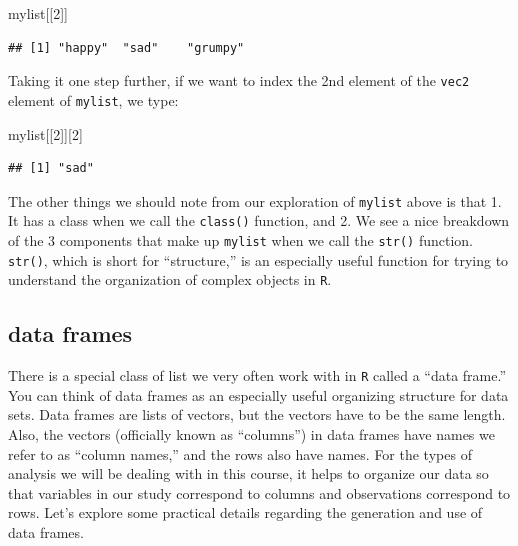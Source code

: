 \documentclass[]{book}
\newenvironment{Shaded}{\begin{snugshade}}{\end{snugshade}}
\newcommand{\DecValTok}[1]{\textcolor[rgb]{0.00,0.00,0.81}{#1}}
\newcommand{\NormalTok}[1]{#1}
\begin{document}
\begin{Shaded}
\begin{Highlighting}[]
\NormalTok{mylist[[}\DecValTok{2}\NormalTok{]]}
\end{Highlighting}
\end{Shaded}

\begin{verbatim}
## [1] "happy"  "sad"    "grumpy"
\end{verbatim}

Taking it one step further, if we want to index the 2nd element of the \texttt{vec2} element of \texttt{mylist}, we type:

\begin{Shaded}
\begin{Highlighting}[]
\NormalTok{mylist[[}\DecValTok{2}\NormalTok{]][}\DecValTok{2}\NormalTok{]}
\end{Highlighting}
\end{Shaded}

\begin{verbatim}
## [1] "sad"
\end{verbatim}

The other things we should note from our exploration of \texttt{mylist} above is that 1. It has a class when we call the \texttt{class()} function, and 2. We see a nice breakdown of the 3 components that make up \texttt{mylist} when we call the \texttt{str()} function. \texttt{str()}, which is short for ``structure,'' is an especially useful function for trying to understand the organization of complex objects in \texttt{R}.

\hypertarget{data-frames}{%
\subsection{data frames}\label{data-frames}}

There is a special class of list we very often work with in \texttt{R} called a ``data frame.'' You can think of data frames as an especially useful organizing structure for data sets. Data frames are lists of vectors, but the vectors have to be the same length. Also, the vectors (officially known as ``columns'') in data frames have names we refer to as ``column names,'' and the rows also have names. For the types of analysis we will be dealing with in this course, it helps to organize our data so that variables in our study correspond to columns and observations correspond to rows. Let's explore some practical details regarding the generation and use of data frames.
\end{document}
